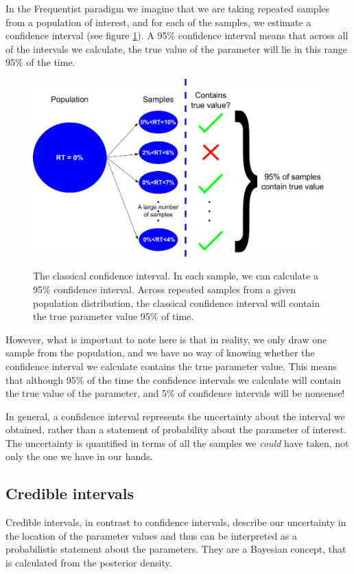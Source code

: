 \documentclass[11pt,fullpage]{book}
\begin{document}
In the Frequentist paradigm we imagine that we are taking repeated samples from a population of interest, and for each of the samples, we estimate a confidence interval (see figure \ref{fig:Posterior_classicalConfidenceInterval}). A 95\% confidence interval means that across all of the intervals we calculate, the true value of the parameter will lie in this range 95\% of the time. 

\begin{figure}
\centering
\scalebox{0.4} 
{\includegraphics{Posterior_classicalConfidenceInterval.pdf}}
\caption{The classical confidence interval. In each sample, we can calculate a 95\% confidence interval. Across repeated samples from a given population distribution, the classical confidence interval will contain the true parameter value 95\% of time.}\label{fig:Posterior_classicalConfidenceInterval}
\end{figure}

However, what is important to note here is that in reality, we only draw one sample from the population, and we have no way of knowing whether the confidence interval we calculate contains the true parameter value. This means that although 95\% of the time the confidence intervals we calculate will contain the true value of the parameter, and 5\% of confidence intervals will be nonsense! 

In general, a confidence interval represents the uncertainty about the interval we obtained, rather than a statement of probability about the parameter of interest. The uncertainty is quantified in terms of all the samples we \textit{could}
have taken, not only the one we have in our hands.

\subsection{Credible intervals}
Credible intervals, in contrast to confidence intervals, describe our uncertainty in the location of the parameter values and thus can be interpreted as a probabilistic statement about the parameters. They are a Bayesian concept, that is calculated from the posterior density.
\end{document}
